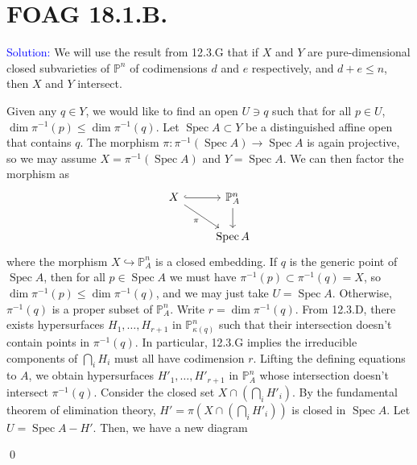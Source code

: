 \documentclass[11pt]{article}
\newcommand{\PP}{\mathbb{P}}
\DeclareMathOperator{\Spec}{\operatorname{Spec}}
\newenvironment{solution}{\begin{trivlist}\item[]{\textcolor{blue}{Solution:}}}{\qed \end{trivlist}}
\begin{document}
\newpage

\section*{FOAG 18.1.B.}

\begin{solution}
    We will use the result from 12.3.G that if $X$ and $Y$ are pure-dimensional closed subvarieties of $\PP^n$ of codimensions $d$ and $e$ respectively, and $d + e \leq n$, then $X$ and $Y$ intersect. 

    Given any $q \in Y$, we would like to find an open $U \ni q$ such that for all $p \in U$, $\dim \pi^{-1}(p) \leq \dim \pi^{-1}(q)$. Let $\Spec A \subset Y$ be a distinguished affine open that contains $q$. The morphism $\pi: \pi^{-1}(\Spec A) \rightarrow \Spec A$ is again projective, so we may assume $X = \pi^{-1}(\Spec A)$ and $Y = \Spec A$. We can then factor the morphism as 
    \[\begin{tikzcd}
        X & {\PP_A^n} \\
        & {\Spec A}
        \arrow[hook, from=1-1, to=1-2]
        \arrow["\pi"', from=1-1, to=2-2]
        \arrow[from=1-2, to=2-2]
    \end{tikzcd}\]
    where the morphism $X \hookrightarrow \PP_A^n$ is a closed embedding. If $q$ is the generic point of $\Spec A$, then for all $p \in \Spec A$ we must have $\pi^{-1}(p) \subset \pi^{-1}(q) = X$, so $\dim \pi^{-1}(p) \leq \dim \pi^{-1}(q)$, and we may just take $U = \Spec A$. Otherwise, $\pi^{-1}(q)$ is a proper subset of $\PP_A^n$. Write $r = \dim \pi^{-1}(q)$. From 12.3.D, there exists hypersurfaces $H_1, \ldots, H_{r+1}$ in $\PP_{\kappa(q)}^n$ such that their intersection doesn't contain points in $\pi^{-1}(q)$. In particular, 12.3.G implies the irreducible components of $\bigcap_i H_i$ must all have codimension $r$. Lifting the defining equations to $A$, we obtain hypersurfaces $H'_1, \ldots, H'_{r+1}$ in $\PP_A^n$ whose intersection doesn't intersect $\pi^{-1}(q)$. Consider the closed set $X \cap (\bigcap_i H'_i)$. By the fundamental theorem of elimination theory, $H' = \pi(X \cap (\bigcap_i H'_i))$ is closed in $\Spec A$. Let $U = \Spec A - H'$. Then, we have a new diagram 

\end{solution}
\end{document}
